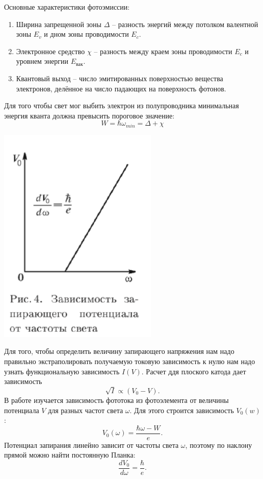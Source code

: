 \documentclass[a4paper,12pt]{article}
\begin{document}
		
		Основные характеристики фотоэмиссии:
		\begin{enumerate}
			\item Ширина запрещенной зоны $\Delta$ -- разность энергий между потолком валентной зоны $E_v$ и дном зоны проводимости $E_c$.
			\item Электронное средство $\chi$ -- разность между краем зоны проводимости $E_c$ и уровнем энергии $E_{\text{вак}}$.
			\item Квантовый выход -- число эмитированных поверхностью вещества электронов, делённое на число падающих на поверхность фотонов.
		\end{enumerate}
		Для того чтобы свет мог выбить электрон из полупроводника минимальная энергия кванта должна превысить пороговое значение: 
		\begin{equation}
			W = \hbar\omega_{min} = \Delta + \chi
		\end{equation}
		\newpage
		\begin{center}
			\includegraphics[width = 40 mm]{t4}
		\end{center}
		Для того, чтобы определить величину запирающего напряжения нам надо правильно экстраполировать получаемую токовую зависимость к нулю нам надо узнать функциональную зависимость $I(V)$. Расчет ддя плоского катода дает зависимость 
		\begin{equation}
			\sqrt{I} \propto (V_0 - V).
		\end{equation}
		В работе изучается зависимость фототока из фотоэлемента от величины потенциала $V$ для разных частот света $\omega$. Для этого строится зависимость $V_0(w)$: 
		\begin{equation}
			V_0(\omega) = \dfrac{\hbar\omega - W}{e}.
		\end{equation}
		Потенциал запирания линейно зависит от частоты света $\omega$, поэтому по наклону прямой можно найти постоянную Планка:
		\begin{equation}
			\dfrac{dV_0}{d\omega} = \dfrac{\hbar}{e}.
		\end{equation}
		
\end{document}
